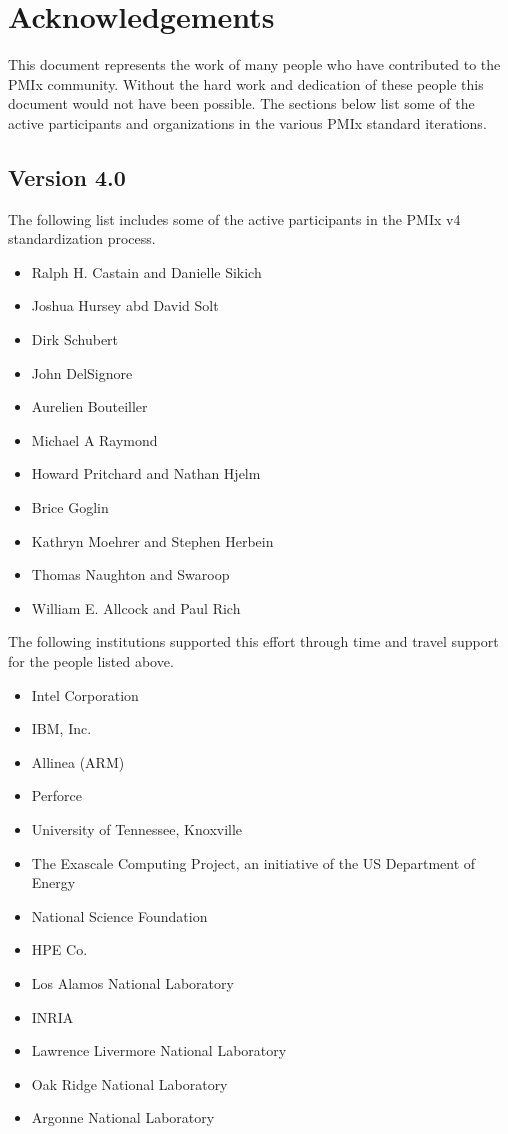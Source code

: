 \chapter{Acknowledgements}
\label{chap:acknowledgements}

This document represents the work of many people who have contributed to the PMIx community.
Without the hard work and dedication of these people this document would not have been possible.
The sections below list some of the active participants and organizations in the various PMIx standard iterations.

\section{Version 4.0}

The following list includes some of the active participants in the PMIx v4 standardization process.

\begin{itemize}
\item Ralph H. Castain and Danielle Sikich
\item Joshua Hursey abd David Solt
\item Dirk Schubert
\item John DelSignore
\item Aurelien Bouteiller
\item Michael A Raymond
\item Howard Pritchard and Nathan Hjelm
\item Brice Goglin
\item Kathryn Moehrer and Stephen Herbein
\item Thomas Naughton and Swaroop
\item William E. Allcock and Paul Rich
\end{itemize}

The following institutions supported this effort through time and travel support for the people listed above.

\begin{itemize}
\item Intel Corporation
\item IBM, Inc.
\item Allinea (ARM)
\item Perforce
\item University of Tennessee, Knoxville
\item The Exascale Computing Project, an initiative of the US Department of Energy
\item National Science Foundation
\item HPE Co.
\item Los Alamos National Laboratory
\item INRIA
\item Lawrence Livermore National Laboratory
\item Oak Ridge National Laboratory
\item Argonne National Laboratory
\end{itemize}


